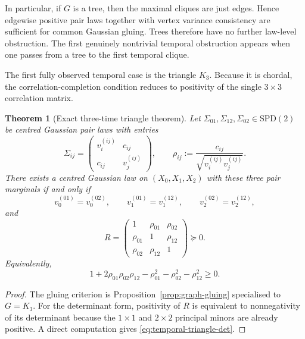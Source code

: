 \documentclass[11pt]{article}
\numberwithin{equation}{section}
\newcommand{\SPD}{\mathrm{SPD}}
\theoremstyle{thmcompact}
\newtheorem{theorem}{Theorem}[section]
\theoremstyle{remark}
\begin{document}
In particular, if $G$ is a tree, then the maximal cliques are just edges. Hence edgewise positive pair laws together with vertex variance consistency are sufficient for common Gaussian gluing. Trees therefore have no further law-level obstruction. The first genuinely nontrivial temporal obstruction appears when one passes from a tree to the first temporal clique.

The first fully observed temporal case is the triangle $K_3$. Because it is chordal, the correlation-completion condition reduces to positivity of the single $3\times3$ correlation matrix.

\begin{theorem}[Exact three-time triangle theorem]\label{thm:temporal-triangle}
Let $\Sigma_{01},\Sigma_{12},\Sigma_{02}\in\SPD(2)$ be centred Gaussian pair laws with entries
\[
\Sigma_{ij}=\begin{pmatrix} v_i^{(ij)} & c_{ij}\\ c_{ij} & v_j^{(ij)}\end{pmatrix},
\qquad
\rho_{ij}:=\frac{c_{ij}}{\sqrt{v_i^{(ij)}v_j^{(ij)}}}.
\]
There exists a centred Gaussian law on $(X_0,X_1,X_2)$ with these three pair marginals if and only if
\[
v_0^{(01)}=v_0^{(02)},\qquad
v_1^{(01)}=v_1^{(12)},\qquad
v_2^{(02)}=v_2^{(12)},
\]
and
\[
R=\begin{pmatrix}
1 & \rho_{01} & \rho_{02}\\
\rho_{01} & 1 & \rho_{12}\\
\rho_{02} & \rho_{12} & 1
\end{pmatrix}\succeq0.
\]
Equivalently,
\begin{equation}\label{eq:temporal-triangle-det}
1+2\rho_{01}\rho_{02}\rho_{12}-\rho_{01}^2-\rho_{02}^2-\rho_{12}^2\ge0.
\end{equation}
\end{theorem}

\begin{proof}
The gluing criterion is Proposition~\ref{prop:graph-gluing} specialised to $G=K_3$. For the determinant form, positivity of $R$ is equivalent to nonnegativity of its determinant because the $1\times1$ and $2\times2$ principal minors are already positive. A direct computation gives \eqref{eq:temporal-triangle-det}.
\end{proof}
\end{document}
